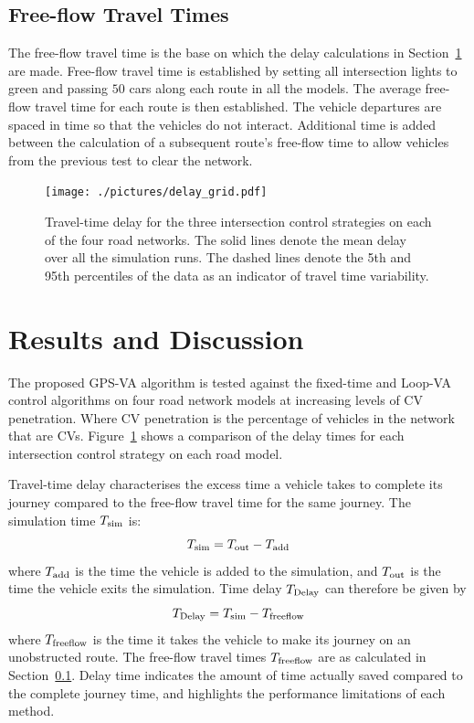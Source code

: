\documentclass[numbered]{trbunofficial}
\begin{document}
\subsection{Free-flow Travel Times}\label{sec:freeflow}
The free-flow travel time is the base on which the delay calculations in Section~\ref{sec:discussion} are made. Free-flow travel time is established by setting all intersection lights to green and passing $50$ cars along each route in all the models. The average free-flow travel time for each route is then established. The vehicle departures are spaced in time so that the vehicles do not interact. Additional time is added between the calculation of a subsequent route's free-flow time to allow vehicles from the previous test to clear the network.

\begin{figure}[!tb]
	\begin{center} 
		\texttt{[image: ./pictures/delay\_grid.pdf]}
		\vspace{-15pt}
		\caption{Travel-time delay for the three intersection control strategies on each of the four road networks. The solid lines denote the mean delay over all the simulation runs. The dashed lines denote the 5th and 95th percentiles of the data as an indicator of travel time variability.}
		\label{fig:results}
	\end{center}
	\vspace{-5pt}
\end{figure}

\section{Results and Discussion}\label{sec:discussion}
The proposed GPS-VA algorithm is tested against the fixed-time and Loop-VA control algorithms on four road network models at increasing levels of CV penetration. Where CV penetration is the percentage of vehicles in the network that are CVs. Figure~\ref{fig:results} shows a comparison of the delay times for each intersection control strategy on each road model. 

Travel-time delay characterises the excess time a vehicle takes to complete its journey compared to the free-flow travel time for the same journey. The simulation time $T_{\rm sim}$ is:
\begin{equation}
T_{\rm sim} = T_{\rm out} - T_{\rm add}
\end{equation}
where $T_{\rm add}$ is the time the vehicle is added to the simulation, and $T_{\rm out}$ is the time the vehicle exits the simulation. Time delay $T_{\rm Delay}$ can therefore be given by
\begin{equation}
T_{\rm Delay} = T_{\rm sim} - T_{\rm freeflow}
\end{equation}	
where $T_{\rm freeflow}$ is the time it takes the vehicle to make its journey on an unobstructed route. The free-flow travel times $T_{\rm freeflow}$ are as calculated in Section~\ref{sec:freeflow}. Delay time indicates the amount of time actually saved compared to the complete journey time, and highlights the performance limitations of each method.
\end{document}
